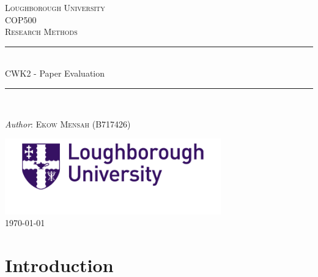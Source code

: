 \documentclass[a4paper, 12pt]{article}
\begin{document}
\begin{titlepage}

 \newcommand{\HRule}{\rule{\linewidth}{0.5mm}}
 
 \center %
 
 \textsc{\LARGE Loughborough University}\\[1.5cm]
 
 \textsc{\Large COP500}\\[0.5cm]
 
 \textsc{\large Research Methods}\\[0.5cm]
 
\HRule\\[0.4cm]

 {\huge CWK2 - Paper Evaluation}\\[0.4cm]

\HRule\\[1.5cm]

\begin{minipage}{0.4\textwidth}
 \begin{center}
   \large
   \textit{Author}: \textsc{Ekow Mensah (B717426)}
 \end{center}
 \end{minipage}

\vfill\vfill

\includegraphics[width=0.7\textwidth]{logo.png}\\[1cm]

\vfill\vfill\vfill
{\large\today}

 
\end{titlepage}
 
\newpage

\tableofcontents

\newpage
\section{Introduction}

\onehalfspacing
\end{document}
